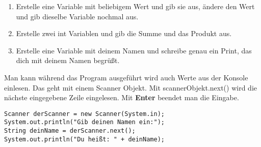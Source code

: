 \documentclass{../../sheet}
\begin{document}
\begin{enumerate}
\begin{ausgabe}
              ...........................@@@@............@@@...............................
              ......................\#@@@@@@@.............:@@@..............................
              ....................@@@@@@@@@@..............+@@@.............................
              ...................=@@@@..@@@@@@@@@@@@@@@@@@@@@@@............................
              ...................@@@@....@@@@.:.............@@@*...........................
              ....................@@@@@@@@@@\#................@@@:..........................
              .....................@@@@@@@@...................@@@..........................
              .............................................................................
          \end{ausgabe}
    \item Erstelle eine Variable mit beliebigem Wert und gib sie aus, ändere den Wert und gib dieselbe Variable nochmal aus.
    \item Erstelle zwei int Variablen und gib die Summe und das Produkt aus.
    \item Erstelle eine Variable mit deinem Namen und schreibe genau ein Print, das dich mit deinem Namen begrüßt.
\end{enumerate}

\newpage
{}
Man kann während das Program ausgeführt wird auch Werte aus der Konsole einlesen. Das geht mit einem Scanner Objekt. Mit scannerObjekt.next() wird die nächste eingegebene Zeile eingelesen. Mit \textbf{Enter} beendet man die Eingabe.
\begin{verbatim}
Scanner derScanner = new Scanner(System.in);
System.out.println("Gib deinen Namen ein:");
String deinName = derScanner.next();
System.out.println("Du heißt: " + deinName);
\end{verbatim}
\end{document}
